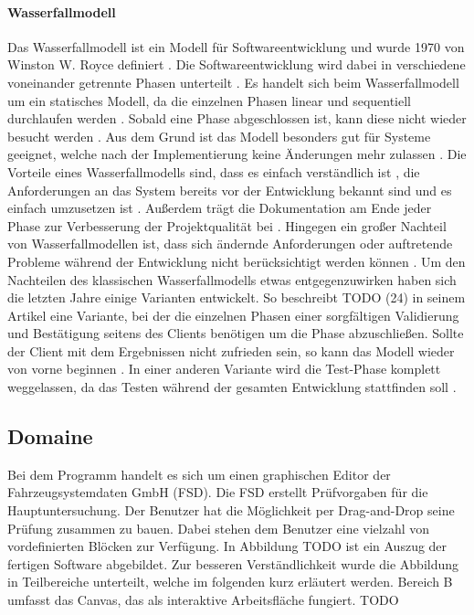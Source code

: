     \paragraph{Wasserfallmodell}
    Das Wasserfallmodell ist ein Modell für Softwareentwicklung \cite{24} und wurde 1970 von Winston W. Royce definiert \cite{25}. 
    Die Softwareentwicklung wird dabei in verschiedene voneinander getrennte Phasen unterteilt \cite{22}.
    Es handelt sich beim Wasserfallmodell um ein statisches Modell, da die einzelnen Phasen linear und sequentiell durchlaufen werden \cite{22}.
    Sobald eine Phase abgeschlossen ist, kann diese nicht wieder besucht werden \cite{22}. 
    Aus dem Grund ist das Modell besonders gut für Systeme geeignet, welche nach der Implementierung keine Änderungen mehr zulassen \cite{22}. 
    Die Vorteile eines Wasserfallmodells sind, dass es einfach verständlich ist \cite{22}, die Anforderungen an das System bereits vor der Entwicklung bekannt sind und es einfach umzusetzen ist \cite{23}.
    Außerdem trägt die Dokumentation am Ende jeder Phase zur Verbesserung der Projektqualität bei \cite{23}.
    Hingegen ein großer Nachteil von Wasserfallmodellen ist, dass sich ändernde Anforderungen oder auftretende Probleme während der Entwicklung nicht berücksichtigt werden können \cite{23}.
    Um den Nachteilen des klassischen Wasserfallmodells etwas entgegenzuwirken haben sich die letzten Jahre einige Varianten entwickelt.
    So beschreibt TODO (24) in seinem Artikel eine Variante, bei der die einzelnen Phasen einer sorgfältigen Validierung und Bestätigung seitens des Clients benötigen um die Phase abzuschließen. 
    Sollte der Client mit dem Ergebnissen nicht zufrieden sein, so kann das Modell wieder von vorne beginnen \cite{24}. 
    In einer anderen Variante wird die Test-Phase komplett weggelassen, da das Testen während der gesamten Entwicklung stattfinden soll \cite{25}.
    \subsection{Domaine}
    Bei dem Programm handelt es sich um einen graphischen Editor der Fahrzeugsystemdaten GmbH (FSD).
    Die FSD erstellt Prüfvorgaben für die Hauptuntersuchung.
    Der Benutzer hat die Möglichkeit per Drag-and-Drop seine Prüfung zusammen zu bauen.
    Dabei stehen dem Benutzer eine vielzahl von vordefinierten Blöcken zur Verfügung.
    In Abbildung TODO ist ein Auszug der fertigen Software abgebildet.
    Zur besseren Verständlichkeit wurde die Abbildung in Teilbereiche unterteilt, welche im folgenden kurz erläutert werden.
    Bereich B umfasst das Canvas, das als interaktive Arbeitsfläche fungiert.
    TODO
    \newpage
